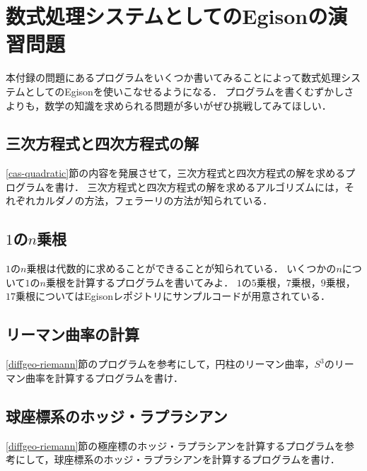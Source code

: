 \chapter{数式処理システムとしてのEgisonの演習問題}

本付録の問題にあるプログラムをいくつか書いてみることによって数式処理システムとしてのEgisonを使いこなせるようになる．
プログラムを書くむずかしさよりも，数学の知識を求められる問題が多いがぜひ挑戦してみてほしい．

\section*{三次方程式と四次方程式の解}

\ref{cas-quadratic}節の内容を発展させて，三次方程式と四次方程式の解を求めるプログラムを書け．
三次方程式と四次方程式の解を求めるアルゴリズムには，それぞれカルダノの方法，フェラーリの方法が知られている．

\section*{$1$の$n$乗根}

$1$の$n$乗根は代数的に求めることができることが知られている．
いくつかの$n$について$1$の$n$乗根を計算するプログラムを書いてみよ．
$1$の$5$乗根，$7$乗根，$9$乗根，$17$乗根についてはEgisonレポジトリにサンプルコードが用意されている．

\section*{リーマン曲率の計算}

\ref{diffgeo-riemann}節のプログラムを参考にして，円柱のリーマン曲率，$S^3$のリーマン曲率を計算するプログラムを書け．

\section*{球座標系のホッジ・ラプラシアン}

\ref{diffgeo-riemann}節の極座標のホッジ・ラプラシアンを計算するプログラムを参考にして，球座標系のホッジ・ラプラシアンを計算するプログラムを書け．
